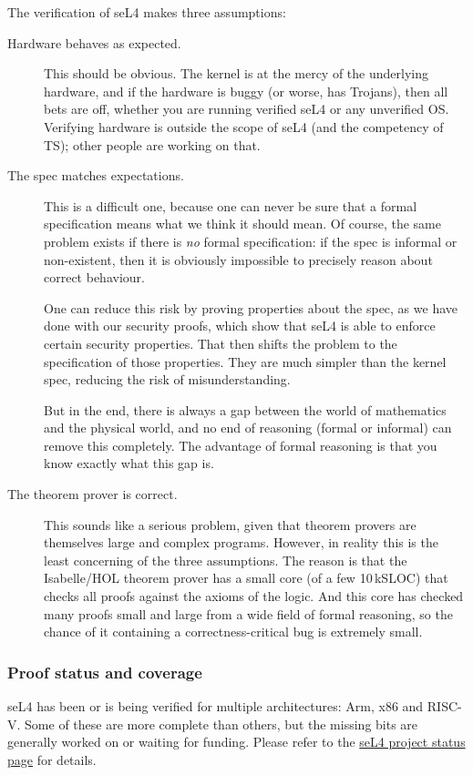 \documentclass[english,a4paper,12pt]{report}
\newcommand{\SSSect}[1]{\subsubsection*{#1}}
\newcommand{\SSSect}[1]{\subsection*{#1}}
\begin{document}
  The verification of seL4 makes three assumptions:
  \begin{description}
  \item[Hardware behaves as expected.] This should be obvious. The
    kernel is at the mercy of the underlying hardware, and if the
    hardware is buggy (or worse, has Trojans), then all bets are off,
    whether you are running verified seL4 or any unverified
    OS. Verifying hardware is outside the scope of seL4 (and
    the competency of TS); other people are working on that.
  \item[The spec matches expectations.] This is a difficult one,
    because one can never be sure that a formal specification means
    what we think it should mean. Of course, the same problem exists
    if there is \emph{no} formal specification: if the spec is informal or
    non-existent, then it is obviously impossible to precisely reason
    about correct behaviour.

    One can reduce this risk by proving properties about the spec, as
    we have done with our security proofs, which show that seL4 is
    able to enforce certain security properties. That then shifts the
    problem to the specification of those properties. They are much
    simpler than the kernel spec, reducing the risk of misunderstanding.

    But in the end, there is always a gap between the world of mathematics  and
    the physical world, and no end of reasoning (formal or informal)
    can remove this completely. The advantage of formal reasoning is
    that you know exactly what this gap is.
  \item[The theorem prover is correct.] This sounds like a serious
    problem, given that theorem provers are themselves large and
    complex programs. However, in reality this is the least concerning
    of the three assumptions. The reason is that the Isabelle/HOL
    theorem prover has a small core (of a few 10\,kSLOC) that checks
    all proofs against the axioms of the logic. And this core has
    checked many proofs small and large from a wide field of formal
    reasoning, so the chance of it containing a correctness-critical
    bug is extremely small.
  \end{description}

  \SSSect{Proof status and coverage}

  seL4 has been or is being verified for multiple architectures: Arm,
  x86 and RISC-V. Some of these are more complete than others, but the
  missing bits are generally worked on or waiting for funding. Please
  refer to the
  \href{https://docs.sel4.systems/projects/sel4/verified-configurations.html}{seL4
    project status page} for details.
\end{document}

